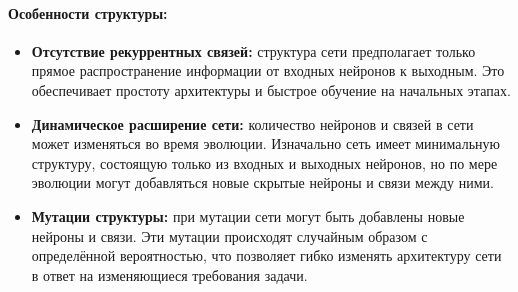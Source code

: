 \documentclass[a4paper,12pt]{article}
\begin{document}
\paragraph{Особенности структуры:}
\begin{itemize}
\item \textbf{Отсутствие рекуррентных связей:} структура сети предполагает только прямое распространение информации от входных нейронов к выходным. Это обеспечивает простоту архитектуры и быстрое обучение на начальных этапах.
    \item \textbf{Динамическое расширение сети:} количество нейронов и связей в сети может изменяться во время эволюции. Изначально сеть имеет минимальную структуру, состоящую только из входных и выходных нейронов, но по мере эволюции могут добавляться новые скрытые нейроны и связи между ними.
    \item \textbf{Мутации структуры:} при мутации сети могут быть добавлены новые нейроны и связи. Эти мутации происходят случайным образом с определённой вероятностью, что позволяет гибко изменять архитектуру сети в ответ на изменяющиеся требования задачи.
\end{itemize}
\end{document}
